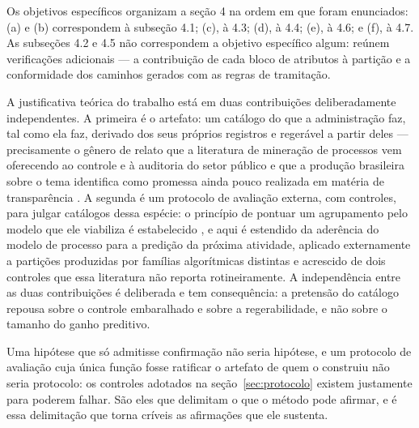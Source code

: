 Os objetivos específicos organizam a seção 4 na ordem em que foram enunciados: (a) e (b)
correspondem à subseção 4.1; (c), à 4.3; (d), à 4.4; (e), à 4.6; e (f), à 4.7. As subseções 4.2 e
4.5 não correspondem a objetivo específico algum: reúnem verificações adicionais --- a
contribuição de cada bloco de atributos à partição e a conformidade dos caminhos gerados com as
regras de tramitação.

A justificativa teórica do trabalho está em duas contribuições deliberadamente independentes. A
primeira é o artefato: um catálogo do que a administração faz, tal como ela faz, derivado dos
seus próprios registros e regerável a partir deles --- precisamente o gênero de relato que a
literatura de mineração de processos vem oferecendo ao controle e à auditoria do setor público
\cite{vanderaalst2010auditing,nai2026procurement} e que a produção brasileira sobre o tema
identifica como promessa ainda pouco realizada em matéria de transparência
\cite{araujo2023mineracao,limaesilva2026analise}. A segunda é um protocolo de avaliação externa,
com controles, para julgar catálogos dessa espécie: o princípio de pontuar um agrupamento pelo
modelo que ele viabiliza é estabelecido \cite{deweerdt2013actitrac}, e aqui é estendido da
aderência do modelo de processo para a predição da próxima atividade, aplicado externamente a
partições produzidas por famílias algorítmicas distintas e acrescido de dois controles que essa
literatura não reporta rotineiramente. A independência entre as duas contribuições é deliberada e
tem consequência: a pretensão do catálogo repousa sobre o controle embaralhado e sobre a
regerabilidade, e não sobre o tamanho do ganho preditivo.

Uma hipótese que só admitisse confirmação não seria hipótese, e um protocolo de avaliação cuja
única função fosse ratificar o artefato de quem o construiu não seria protocolo: os controles
adotados na seção~\ref{sec:protocolo} existem justamente para poderem falhar. São eles que delimitam o que o
método pode afirmar, e é essa delimitação que torna críveis as afirmações que ele sustenta.

